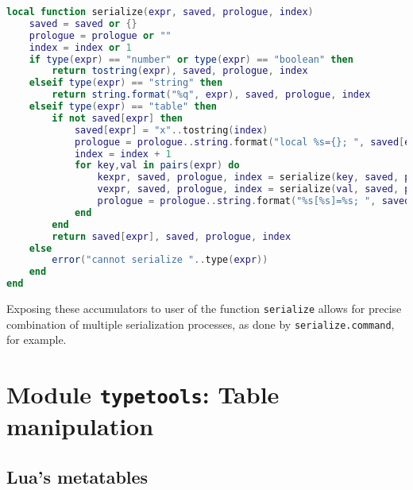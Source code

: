 \begin{lstlisting}[language=lua, caption={The private function \texttt{serialize} of the module \texttt{serialize}}, label=lst:serialize, name=lst:serialize]
local function serialize(expr, saved, prologue, index)
	saved = saved or {}
	prologue = prologue or ""
	index = index or 1
	if type(expr) == "number" or type(expr) == "boolean" then
		return tostring(expr), saved, prologue, index
	elseif type(expr) == "string" then
		return string.format("%q", expr), saved, prologue, index
	elseif type(expr) == "table" then
		if not saved[expr] then
			saved[expr] = "x"..tostring(index)
			prologue = prologue..string.format("local %s={}; ", saved[expr])
			index = index + 1
			for key,val in pairs(expr) do
				kexpr, saved, prologue, index = serialize(key, saved, prologue, index)
				vexpr, saved, prologue, index = serialize(val, saved, prologue, index)
				prologue = prologue..string.format("%s[%s]=%s; ", saved[expr], kexpr, vexpr)
			end
		end
		return saved[expr], saved, prologue, index
	else
		error("cannot serialize "..type(expr))
	end
end
\end{lstlisting}

Exposing these accumulators to user of the function \texttt{serialize} allows for precise combination of multiple serialization processes, as done by \texttt{serialize.command}, for example.


\section{Module \texttt{typetools}: Table manipulation}

\subsection{Lua's metatables}
\label{sec:metatables}

